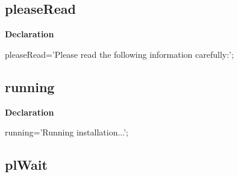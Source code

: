 \documentclass{report}
\newif\ifpdf
\begin{document}
\subsection*{pleaseRead}
\fi
\label{trstrings-pleaseRead}
\begin{list}{}{
\setlength{\itemindent}{0cm}
\setlength{\listparindent}{0cm}
\setlength{\leftmargin}{\evensidemargin}
\addtolength{\leftmargin}{\tmplength}
\settowidth{\labelsep}{X}
\addtolength{\leftmargin}{\labelsep}
\setlength{\labelwidth}{\tmplength}
}
\item[\textbf{Declaration}\hfill]
\ifpdf
\begin{flushleft}
\fi
\begin{ttfamily}
pleaseRead='Please read the following information carefully:';\end{ttfamily}

\ifpdf
\end{flushleft}
\fi

\end{list}
\ifpdf
\subsection*{\large{\textbf{running}}\normalsize\hspace{1ex}\hrulefill}
\else
\subsection*{running}
\fi
\label{trstrings-running}
\begin{list}{}{
\setlength{\itemindent}{0cm}
\setlength{\listparindent}{0cm}
\setlength{\leftmargin}{\evensidemargin}
\addtolength{\leftmargin}{\tmplength}
\settowidth{\labelsep}{X}
\addtolength{\leftmargin}{\labelsep}
\setlength{\labelwidth}{\tmplength}
}
\item[\textbf{Declaration}\hfill]
\ifpdf
\begin{flushleft}
\fi
\begin{ttfamily}
running='Running installation...';\end{ttfamily}

\ifpdf
\end{flushleft}
\fi

\end{list}
\ifpdf
\subsection*{\large{\textbf{plWait}}\normalsize\hspace{1ex}\hrulefill}
\else
\end{document}
